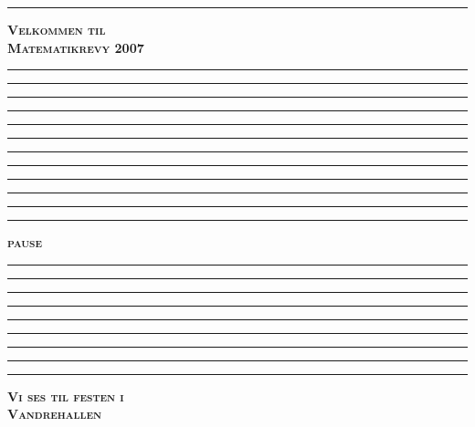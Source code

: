 \documentclass[12pt]{article}
\newcommand{\alignment}[1]{
\rule{0.1pt}{0.1pt}\vspace{0.1cm}

#1
}
\newcommand{\pause}{\newpage%
\rule{0.1pt}{0.1pt}\newpage %
}
\begin{document}
\color{white}
\pagecolor{black}
\alignment{
  \begin{center}
  \begin{Huge}
  \textbf{\textsc{Velkommen til}}\\[10pt]
  \textbf{\textsc{Matematikrevy 2007}}
  \end{Huge}
  \end{center}
}

\pause



\pause



\pause



\pause



\pause



\pause



\pause

\newpage

\pause



\pause



\pause



\rule{0.1pt}{0.1pt}\vspace{5cm}

\rule{0.1pt}{0.1pt}
 
\textbf{\Huge{\textsc{pause}}}
 

\pause



\pause



\pause



\pause



\pause



\pause



\pause



\pause

\alignment{
  \begin{center}
  \begin{Huge}
  \textbf{\textsc{Vi ses til festen i}}\\[10pt]
  \textbf{\textsc{Vandrehallen}}
  \end{Huge}
  \end{center}
}
\end{document}
